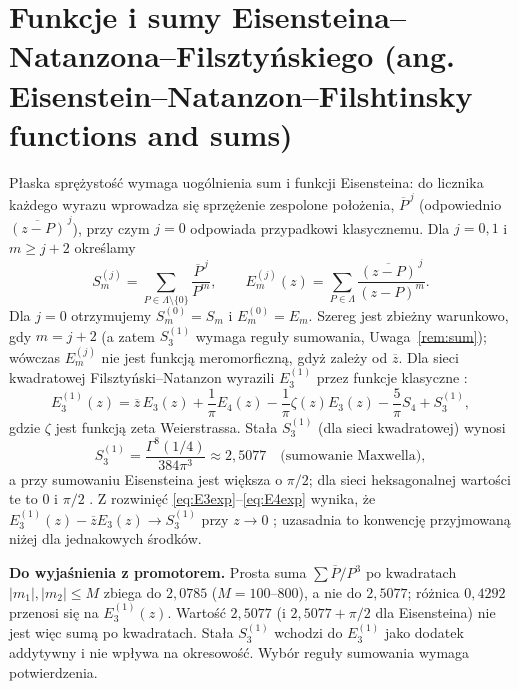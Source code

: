 \documentclass[12pt,a4paper,twoside,openright]{report}
\theoremstyle{definition}
\theoremstyle{remark}
\newcommand{\cc}[1]{\overline{#1}}
\newcommand{\czer}[1]{{\color{red}#1}}
\begin{document}
\section{Funkcje i sumy Eisensteina--Natanzona--Filsztyńskiego (ang. Eisenstein–Natanzon–Filshtinsky functions and sums)}

Płaska sprężystość wymaga uogólnienia sum i funkcji Eisensteina: do licznika każdego wyrazu wprowadza się sprzężenie zespolone położenia, $\cc{P}^{\,j}$ (odpowiednio $\cc{(z-P)}^{\,j}$), przy czym $j=0$ odpowiada przypadkowi klasycznemu. Dla $j=0,1$ i $m\ge j+2$ określamy
\begin{equation}\label{eq:SmjENF}
S_m^{(j)}=\sum_{P\in\Lambda\setminus\{0\}}\frac{\cc{P}^{\,j}}{P^{m}},\qquad
E_m^{(j)}(z)=\sum_{P\in\Lambda}\frac{\cc{(z-P)}^{\,j}}{(z-P)^m}.
\end{equation}
Dla $j=0$ otrzymujemy $S_m^{(0)}=S_m$ i $E_m^{(0)}=E_m$. Szereg jest zbieżny warunkowo, gdy $m=j+2$ (a zatem $S_3^{(1)}$ wymaga reguły sumowania, Uwaga~\ref{rem:sum}); wówczas $E_m^{(j)}$ nie jest funkcją meromorficzną, gdyż zależy od $\cc z$. Dla sieci kwadratowej Fil\-sztyński--Natanzon wyrazili $E_3^{(1)}$ przez funkcje klasyczne \cite{czapla2025computational}:
\begin{equation}\label{eq:E31}
E_3^{(1)}(z)=\cc{z}\,E_3(z)+\frac1\pi E_4(z)-\frac1\pi\zeta(z)E_3(z)-\frac5\pi S_4+S_3^{(1)},
\end{equation}
gdzie $\zeta$ jest funkcją zeta Weierstrassa. Stała $S_3^{(1)}$ (dla sieci kwadratowej) wynosi
\begin{equation}\label{eq:S31}
S_3^{(1)}=\frac{\Gamma^8(1/4)}{384\pi^3}\approx 2{,}5077\quad\text{(sumowanie Maxwella)},
\end{equation}
a przy sumowaniu Eisensteina jest większa o $\pi/2$; dla sieci heksagonalnej wartości te to $0$ i $\pi/2$ \cite{mityushev2025computationalpart3}. Z rozwinięć \eqref{eq:E3exp}--\eqref{eq:E4exp} wynika, że $E_3^{(1)}(z)-\cc zE_3(z)\to S_3^{(1)}$ przy $z\to0$ \cite{czapla2025computational}; uzasadnia to konwencję przyjmowaną niżej dla jednakowych środków.

\czer{\textbf{Do wyjaśnienia z promotorem.} Prosta suma $\sum\cc P/P^3$ po kwadratach $|m_1|,|m_2|\le M$ zbiega do $2{,}0785$ ($M=100$--$800$), a nie do $2{,}5077$; różnica $0{,}4292$ przenosi się na $E_3^{(1)}(z)$. Wartość $2{,}5077$ (i $2{,}5077+\pi/2$ dla Eisensteina) nie jest więc sumą po kwadratach. Stała $S_3^{(1)}$ wchodzi do $E_3^{(1)}$ jako dodatek addytywny i nie wpływa na okresowość. Wybór reguły sumowania wymaga potwierdzenia.}
\end{document}

